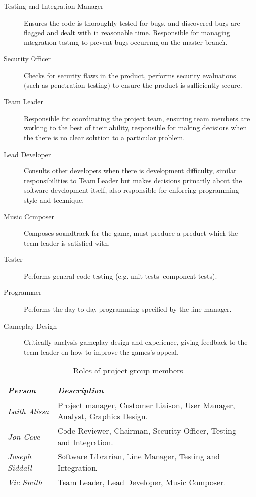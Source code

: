 \begin{description}
    \item[Testing and Integration Manager] Ensures the code is thoroughly tested for bugs, and discovered bugs are flagged and dealt with in reasonable time. Responsible for managing integration testing to prevent bugs occurring on the master branch.
     
    \item[Security Officer] Checks for security flaws in the product, performs security evaluations (such as penetration testing) to ensure the product is sufficiently secure.
     
    \item[Team Leader] Responsible for coordinating the project team, ensuring team members are working to the best of their ability, responsible for making decisions when the there is no clear solution to a particular problem.
      
    \item[Lead Developer] Consults other developers when there is development difficulty, similar responsibilities to Team Leader but makes decisions primarily about the software development itself,  also responsible for enforcing programming style and technique.
     
    \item[Music Composer] Composes soundtrack for the game, must produce a product which the team leader is satisfied with.
    
    \item[Tester] Performs general code testing (e.g. unit tests, component tests).
    
    \item[Programmer] Performs the day-to-day programming specified by the line manager.
    
    \item[Gameplay Design] Critically analysis gameplay design and experience, giving feedback to the team leader on how to improve the games's appeal.
\end{description}

\begin{table*}
	\begin{tabular}{l p{38em}}
		\toprule
		\emph{Person} & \emph{Description} \\
		\midrule
		\emph{Laith Alissa} & Project manager, Customer Liaison, User Manager, Analyst, Graphics Design.\\[0.5em]
		\emph{Jon Cave} & Code Reviewer, Chairman, Security Officer, Testing and Integration.\\[0.5em]
		\emph{Joseph Siddall} & Software Librarian, Line Manager, Testing and Integration.\\[0.5em]
		\emph{Vic Smith} & Team Leader, Lead Developer, Music Composer.\\[0.5em]
		\bottomrule
		\caption{Roles of project group members}
	\end{tabular}
	\label{tab:roles}
\end{table*}